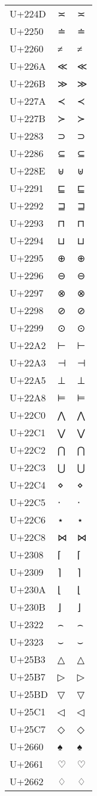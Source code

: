 \documentclass{article}
\begin{document}
\begin{longtable}{lll}
U+224D & ≍ & ≍ \\
U+2250 & ≐ & ≐ \\
U+2260 & ≠ & ≠ \\
U+226A & ≪ & ≪ \\
U+226B & ≫ & ≫ \\
U+227A & ≺ & ≺ \\
U+227B & ≻ & ≻ \\
U+2283 & ⊃ & ⊃ \\
U+2286 & ⊆ & ⊆ \\
U+228E & ⊎ & ⊎ \\
U+2291 & ⊑ & ⊑ \\
U+2292 & ⊒ & ⊒ \\
U+2293 & ⊓ & ⊓ \\
U+2294 & ⊔ & ⊔ \\
U+2295 & ⊕ & ⊕ \\
U+2296 & ⊖ & ⊖ \\
U+2297 & ⊗ & ⊗ \\
U+2298 & ⊘ & ⊘ \\
U+2299 & ⊙ & ⊙ \\
U+22A2 & ⊢ & ⊢ \\
U+22A3 & ⊣ & ⊣ \\
U+22A5 & ⊥ & ⊥ \\
U+22A8 & ⊨ & ⊨ \\
U+22C0 & ⋀ & ⋀ \\
U+22C1 & ⋁ & ⋁ \\
U+22C2 & ⋂ & ⋂ \\
U+22C3 & ⋃ & ⋃ \\
U+22C4 & ⋄ & ⋄ \\
U+22C5 & ⋅ & ⋅ \\
U+22C6 & ⋆ & ⋆ \\
U+22C8 & ⋈ & ⋈ \\
U+2308 & ⌈ & ⌈ \\
U+2309 & ⌉ & ⌉ \\
U+230A & ⌊ & ⌊ \\
U+230B & ⌋ & ⌋ \\
U+2322 & ⌢ & ⌢ \\
U+2323 & ⌣ & ⌣ \\
U+25B3 & △ & △ \\
U+25B7 & ▷ & ▷ \\
U+25BD & ▽ & ▽ \\
U+25C1 & ◁ & ◁ \\
U+25C7 & ◇ & ◇ \\
U+2660 & ♠ & ♠ \\
U+2661 & ♡ & ♡ \\
U+2662 & ♢ & ♢ \\

\end{longtable}
\end{document}
